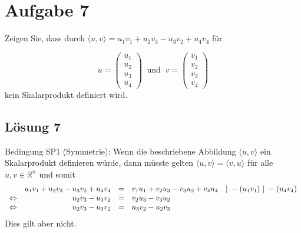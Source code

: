 \section{Aufgabe 7}

Zeigen Sie, dass durch $\displaystyle \langle u,v\rangle =u_{1} v_{1} +u_{2} v_{3} -u_{3} v_{2} +u_{4} v_{4}$ für 

\begin{equation*}
  u=\begin{pmatrix}
    u_{1}\\
    u_{2}\\
    u_{3}\\
    u_{4}
  \end{pmatrix} \ \text{ und } \ v=\begin{pmatrix}
    v_{1}\\
    v_{2}\\
    v_{3}\\
    v_{4}
  \end{pmatrix}
\end{equation*}
kein Skalarprodukt definiert wird. 


\subsection{Lösung 7}

Bedingung SP1 (Symmetrie): Wenn die beschriebene Abbildung $\displaystyle \langle u,v\rangle $ ein Skalarprodukt definieren würde, dann müsste gelten $\displaystyle \langle u,v\rangle =\langle v,u\rangle $ für alle $\displaystyle u,v\in \mathbb{R}^{n}$ und somit
\begin{equation*}
  \begin{array}{ c r c l l }
    & u_{1} v_{1} +u_{2} v_{3} -u_{3} v_{2} +u_{4} v_{4} & = & v_{1} u_{1} +v_{2} u_{3} -v_{3} u_{2} +v_{4} u_{4} & |\ -( u_{1} v_{1}) \ |\ -( u_{4} v_{4})\\
    \Leftrightarrow  & u_{2} v_{3} -u_{3} v_{2} & = & v_{2} u_{3} -v_{3} u_{2} & \\
    \Leftrightarrow  & u_{2} v_{3} -u_{3} v_{2} & = & u_{3} v_{2} -u_{2} v_{3} & 
  \end{array}
\end{equation*}
Dies gilt aber nicht.
